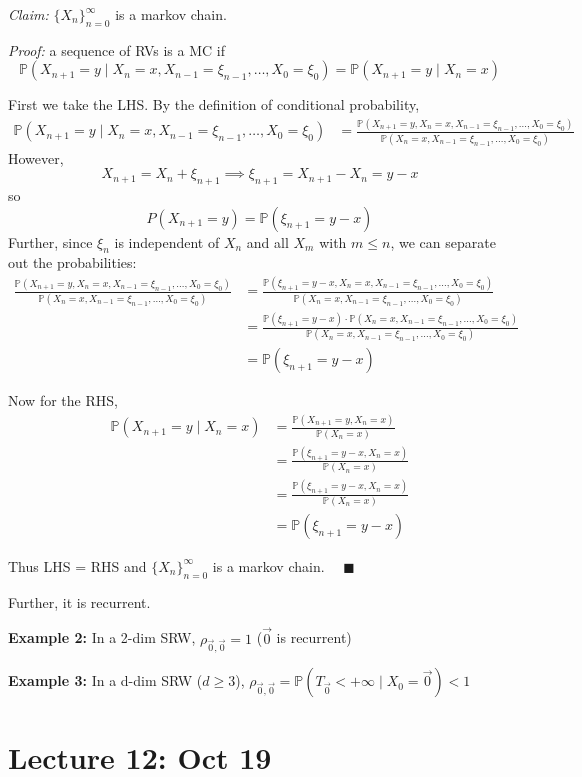 \documentclass[12pt]{article}
\renewcommand{\P}{\mathbb{P}}
\newcommand{\qed}{\quad \blacksquare}
\begin{document}
\emph{Claim:} $\{X_n\}_{n=0}^\infty$ is a markov chain. 

\emph{Proof:} a sequence of RVs is a MC if 
\[\P(X_{n+1} = y \; | \; X_n = x, X_{n-1} = \xi_{n-1}, \dots, X_0 = \xi_0) = \P(X_{n+1}= y\; | \; X_n = x)\]

First we take the LHS. By the definition of conditional probability, 
\begin{align*}
    \P(X_{n+1} = y \; | \; X_n = x, X_{n-1} = \xi_{n-1}, \dots, X_0 = \xi_0) &= \frac{\P(X_{n+1} = y, X_n = x, X_{n-1} = \xi_{n-1}, \dots, X_0 = \xi_0)}{\P(X_n = x, X_{n-1} = \xi_{n-1}, \dots, X_0 = \xi_0)}
\end{align*}
However, 
\[X_{n+1} = X_n + \xi_{n+1} \implies \xi_{n+1} = X_{n+1} - X_n = y - x\]
so 
\[P(X_{n+1} = y) = \P(\xi_{n+1} = y - x)\]
Further, since $\xi_n$ is independent of $X_n$ and all $X_m$ with $m \leq n$, we can separate out the probabilities:
\begin{align*}
    \frac{\P(X_{n+1} = y, X_n = x, X_{n-1} = \xi_{n-1}, \dots, X_0 = \xi_0)}{\P(X_n = x, X_{n-1} = \xi_{n-1}, \dots, X_0 = \xi_0)} &= \frac{\P(\xi_{n+1} = y -x, X_n = x, X_{n-1} = \xi_{n-1}, \dots, X_0 = \xi_0)}{\P(X_n = x, X_{n-1} = \xi_{n-1}, \dots, X_0 = \xi_0)}\\
    &= \frac{\P(\xi_{n+1} = y-x) \cdot \P(X_n = x, X_{n-1} = \xi_{n-1}, \dots, X_0 = \xi_0)}{\P(X_n = x, X_{n-1} = \xi_{n-1}, \dots, X_0 = \xi_0)} \\
    &= \P(\xi_{n+1} = y-x)
\end{align*}

Now for the RHS, 
\begin{align*}
    \P(X_{n+1} = y \; | \; X_n = x) &= \frac{\P(X_{n+1} = y, X_n = x)}{\P(X_n = x)}\\
    &= \frac{\P(\xi_{n+1} = y -x, X_n = x)}{\P(X_n = x)}\\
    &= \frac{\P(\xi_{n+1} = y -x, X_n = x)}{\P(X_n = x)}\\
    &= \P(\xi_{n+1} = y -x)
\end{align*}

Thus LHS = RHS and $\{X_n\}_{n=0}^\infty$ is a markov chain. $\qed$

Further, it is recurrent. 

\textbf{Example 2:} In a 2-dim SRW, $\rho_{\vec 0, \vec 0 } = 1$ ($\vec 0$ is recurrent)

\textbf{Example 3:} In a d-dim SRW ($d \geq 3$), $\rho_{\vec 0, \vec 0} = \P(T_{\vec 0} < +\infty \; | \; X_0 = \vec 0) < 1$ 

\section{Lecture 12: Oct 19}
\end{document}
